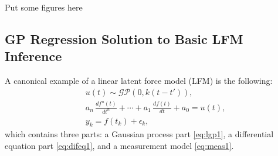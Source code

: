 \documentclass[journal]{IEEEtran}
\newcommand{\simo}[1]{{\color{red}#1}}
\begin{document}

\simo{Put some figures here}

\subsection{GP Regression Solution to Basic LFM Inference}\label{sec:gp:regression:lfm}
%

A canonical example of a linear latent force model (LFM) \cite{Alvarez+Lawrence:2009,Alvarez+Luengo+Lawrence:2013} is the following:
%
\begin{eqnarray}
  &u(t) \sim \mathcal{GP}(0,k(t - t')), \label{eq:lgp1} \\
  &a_n \, \frac{df^{n}(t)}{dt^{n}} + \cdots
  + a_1 \, \frac{df(t)}{dt} + a_0 = u(t), \label{eq:difeq1} \\
  &y_k = f(t_k) + \epsilon_k, \label{eq:meas1}
\end{eqnarray}
%
which contains three parts: a Gaussian process part \eqref{eq:lgp1}, a differential equation part \eqref{eq:difeq1}, and a measurement model \eqref{eq:meas1}. 
\end{document}
